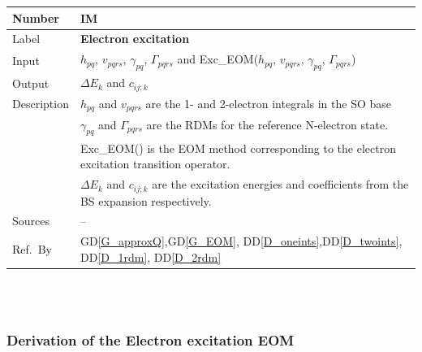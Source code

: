 \documentclass[12pt]{article}
\newcommand{\colAwidth}{0.13\textwidth}
\newcommand{\colBwidth}{0.82\textwidth}
\newcommand{\dref}[1]{GD\ref{#1}}
\newcommand{\ddref}[1]{DD\ref{#1}}
\newcounter{instnum} %
\begin{document}
\noindent
\begin{minipage}{\textwidth}
	\renewcommand*{\arraystretch}{1.5}
	\begin{tabular}{| p{\colAwidth} | p{\colBwidth}|}
		\hline
		\rowcolor[gray]{0.9}
		Number& IM{instnum}\theinstnum \label{IM_Exc}\\
		\hline
		Label& \bf Electron excitation\\
		\hline
		Input&$h_{pq}$, $v_{pqrs}$, $\gamma_{pq}$, $\Gamma_{pqrs}$ and 
		Exc\_EOM($h_{pq}$, $v_{pqrs}$, $\gamma_{pq}$, $\Gamma_{pqrs}$)\\
		\hline
		Output&$\Delta E_k$ and $c_{ij;k}$\\
		\hline
		Description& $h_{pq} $ and $ v_{pqrs}$ are the 1- and 2-electron 
		integrals in 
		the SO base\\
		& $\gamma_{pq}$ and $\Gamma_{pqrs}$ are the RDMs for the reference 
		N-electron 
		state.\\
		& Exc\_EOM() is the EOM method corresponding to the electron excitation 
		transition operator.\\
		&$\Delta E_k$ and $c_{ij;k}$ are the excitation energies and 
		coefficients from the BS expansion respectively.\\
		\hline
		Sources& -- \\
		\hline
		Ref.\ By & \dref{G_approxQ},\dref{G_EOM},  
		\ddref{D_oneints},\ddref{D_twoints}, \ddref{D_1rdm}, 
		\ddref{D_2rdm}\\
		\hline
	\end{tabular}
\end{minipage}\\

~\newline

\subsubsection*{Derivation of the Electron excitation EOM}
\end{document}
